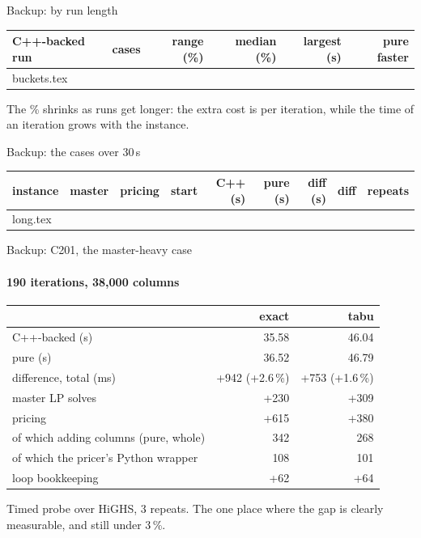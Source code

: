 \documentclass[aspectratio=169]{beamer}
\begin{document}
\appendix
\begin{frame}{Backup: by run length}
  \centering
  \begin{tabular}{lrrrrr}
    \toprule
    C++-backed run & cases & range (\%) & median (\%) & largest (s) & pure faster \\
    \midrule
     buckets.tex
    \bottomrule
  \end{tabular}

  \vspace{1em}
  \small The \% shrinks as runs get longer: the extra cost is per iteration, while the time of an iteration grows
  with the instance.
\end{frame}

\begin{frame}{Backup: the cases over 30\,s}
  \centering\scriptsize
  \begin{tabular}{llllrrrrr}
    \toprule
    instance & master & pricing & start & C++ (s) & pure (s) & diff (s) & diff & repeats \\
    \midrule
     long.tex
    \bottomrule
  \end{tabular}
\end{frame}

\begin{frame}{Backup: C201, the master-heavy case}
  \framesubtitle{190 iterations, 38,000 columns}
  \centering
  \begin{tabular}{lrr}
    \toprule
    & exact & tabu \\
    \midrule
    C++-backed (s) & 35.58 & 46.04 \\
    pure (s) & 36.52 & 46.79 \\
    \midrule
    difference, total (ms) & +942 (+2.6\,\%) & +753 (+1.6\,\%) \\
    \quad master LP solves & +230 & +309 \\
    \quad pricing & +615 & +380 \\
    \qquad of which adding columns (pure, whole) & 342 & 268 \\
    \qquad of which the pricer's Python wrapper & 108 & 101 \\
    \quad loop bookkeeping & +62 & +64 \\
    \bottomrule
  \end{tabular}

  \vspace{0.8em}\small
  Timed probe over HiGHS, 3 repeats. The one place where the gap is clearly measurable, and still under 3\,\%.
\end{frame}
\end{document}

